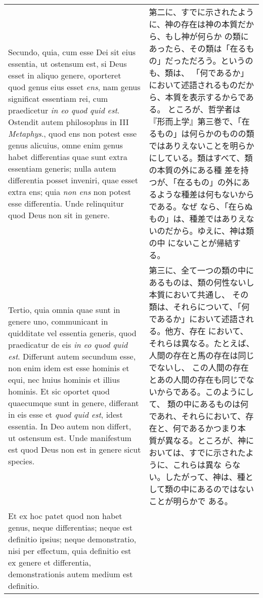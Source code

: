 \documentclass[10pt]{jsarticle}
\begin{document}
\begin{longtable}{p{21em}p{21em}}
\\

Secundo, quia, cum esse Dei sit eius essentia, ut ostensum est, si
Deus esset in aliquo genere, oporteret quod genus eius esset {\itshape
ens}, nam genus significat essentiam rei, cum praedicetur {\itshape in
eo quod quid est}.  Ostendit autem philosophus in III {\itshape
Metaphys}., quod ens non potest esse genus alicuius, omne enim genus
habet differentias quae sunt extra essentiam generis; nulla autem
differentia posset inveniri, quae esset extra ens; quia {\itshape non
ens} non potest esse differentia.  Unde relinquitur quod Deus non sit
in genere.

&

第二に、すでに示されたように、神の存在は神の本質だから、もし神が何らか
の類にあったら、その類は「在るもの」だっただろう。というのも、類は、
「何であるか」において述語されるものだから、本質を表示するからである。
ところが、哲学者は『形而上学』第三巻で、「在るもの」は何らかのものの類
ではありえないことを明らかにしている。類はすべて、類の本質の外にある種
差を持つが、「在るもの」の外にあるような種差は何もないからである。なぜ
なら、「在らぬもの」は、種差ではありえないのだから。ゆえに、神は類の中
にないことが帰結する。

\\

Tertio, quia omnia quae sunt in genere uno, communicant in quidditate
vel essentia generis, quod praedicatur de eis {\itshape in eo quod
quid est}.  Differunt autem secundum esse, non enim idem est esse
hominis et equi, nec huius hominis et illius hominis.  Et sic oportet
quod quaecumque sunt in genere, differant in eis esse et {\itshape
quod quid est}, idest essentia.  In Deo autem non differt, ut ostensum
est.  Unde manifestum est quod Deus non est in genere sicut species.

&

第三に、全て一つの類の中にあるものは、類の何性ないし本質において共通し、
その類は、それらについて、「何であるか」において述語される。他方、存在
において、それらは異なる。たとえば、人間の存在と馬の存在は同じでないし、
この人間の存在とあの人間の存在も同じでないからである。このようにして、
類の中にあるものは何であれ、それらにおいて、存在と、何であるかつまり本
質が異なる。ところが、神においては、すでに示されたように、これらは異な
らない。したがって、神は、種として類の中にあるのではないことが明らかで
ある。

\\

Et ex hoc patet quod non habet genus, neque differentias; neque est
definitio ipsius; neque demonstratio, nisi per effectum, quia
definitio est ex genere et differentia, demonstrationis autem medium
est definitio.


\end{longtable}
\end{document}
